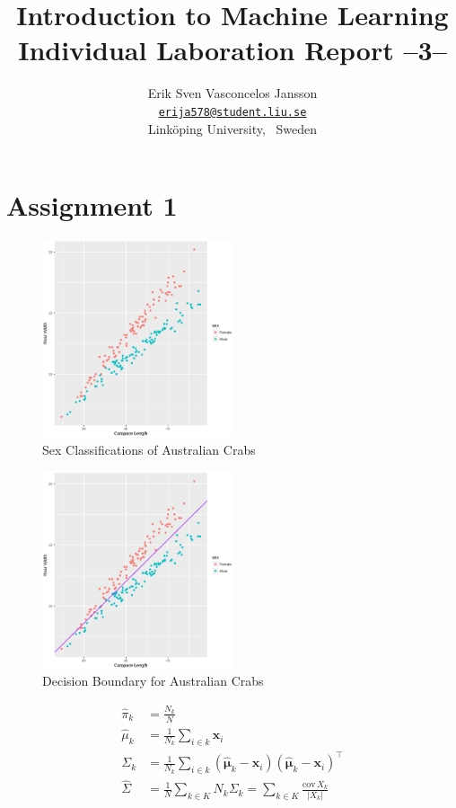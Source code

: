 \documentclass[a4paper, twocolumn]{article}
\title{Introduction to Machine Learning \\
       Individual Laboration Report --3--}
\author{{Erik Sven Vasconcelos Jansson} \\
        {\href{mailto:erija578@student.liu.se}
        {\texttt{erija578@student.liu.se}}} \\
        {Linköping University, \, Sweden}}
\begin{document}
    \maketitle %

    \section*{Assignment 1}

        \begin{figure}[h!]
            \centering
            \caption{Sex Classifications of Australian Crabs}
            \label{fig:crabs}
            \includegraphics[width=0.5\textwidth]{share/crabs.eps}
        \end{figure}

        \begin{figure}[h!]
            \centering
            \caption{Decision Boundary for Australian Crabs}
            \label{fig:boundary}
            \includegraphics[width=0.5\textwidth]{share/boundary.eps}
        \end{figure}

        \begin{equation} \label{eq:lda}
        \begin{split}
            \hat{\pi}_k &= \frac{N_k}{N} \\
            \hat{\mu}_k &= \frac{1}{N_k}\sum_{i \in k}{\bm{x}_i} \\
            \Sigma_k &= \frac{1}{N_k}\sum_{i \in k}{(\bm{\hat{\mu}}_k - \bm{x}_i)(\bm{\hat{\mu}}_k - \bm{x}_i)^\intercal} \\
            \hat\Sigma &= \frac{1}{N}\sum_{k \in K}{N_k \Sigma_k} = \sum_{k \in K}{\frac{\mathrm{cov}\,X_k}{|X_k|}}
        \end{split}
        \end{equation}
\end{document}
